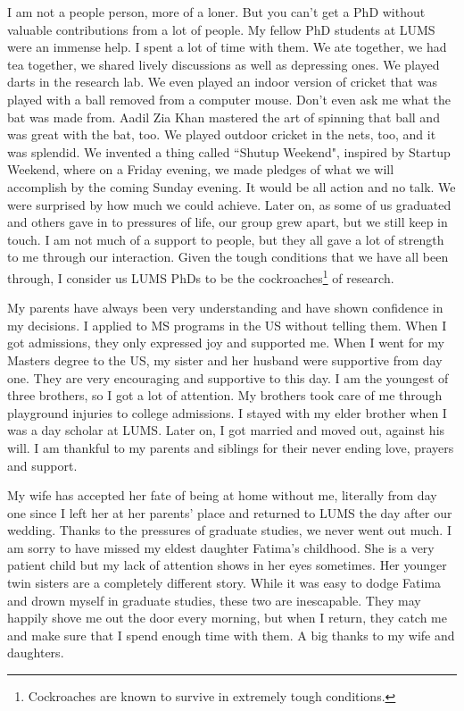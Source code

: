 I am not a people person, more of a loner. But you can't get a PhD without valuable contributions from a lot of people. My fellow PhD students at LUMS were an immense help. I spent a lot of time with them. We ate together, we had tea together, we shared lively discussions as well as depressing ones. We played darts in the research lab. We even played an indoor version of cricket that was played with a ball removed from a computer mouse. Don't even ask me what the bat was made from. Aadil Zia Khan mastered the art of spinning that ball and was great with the bat, too. We played outdoor cricket in the nets, too, and it was splendid. We invented a thing called ``Shutup Weekend", inspired by Startup Weekend, where on a Friday evening, we made pledges of what we will accomplish by the coming Sunday evening. It would be all action and no talk. We were surprised by how much we could achieve. Later on, as some of us graduated and others gave in to pressures of life, our group grew apart, but we still keep in touch. I am not much of a support to people, but they all gave a lot of strength to me through our interaction. Given the tough conditions that we have all been through, I consider us LUMS PhDs to be the cockroaches\footnote{Cockroaches are known to survive in extremely tough conditions.} of research.


My parents have always been very understanding and have shown confidence in my decisions. I applied to MS programs in the US without telling them. When I got admissions, they only expressed joy and supported me. When I went for my Masters degree to the US, my sister and her husband were supportive from day one. They are very encouraging and supportive to this day. I am the youngest of three brothers, so I got a lot of attention. My brothers took care of me through playground injuries to college admissions. I stayed with my elder brother when I was a day scholar at LUMS. Later on, I got married and moved out, against his will. I am thankful to my parents and siblings for their never ending love, prayers and support.


My wife has accepted her fate of being at home without me, literally from day one since I left her at her parents' place and returned to LUMS the day after our wedding. Thanks to the pressures of graduate studies, we never went out much. I am sorry to have missed my eldest daughter Fatima's childhood. She is a very patient child but my lack of attention shows in her eyes sometimes. Her younger twin sisters are a completely different story. While it was easy to dodge Fatima and drown myself in graduate studies, these two are inescapable. They may happily shove me out the door every morning, but when I return, they catch me and make sure that I spend enough time with them. A big thanks to my wife and daughters.


